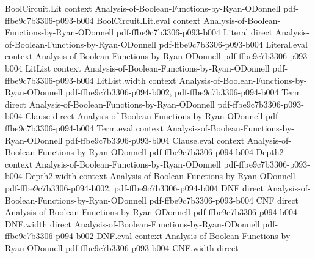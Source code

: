 \begin{lemma}
\label{LMN.depth3_restricted_has_nice_cnf}
\leanok
{}
\proofstep
  {BoolCircuit.Lit}
  {context}
  {Analysis-of-Boolean-Functions-by-Ryan-ODonnell}
  {pdf-ffbe9c7b3306-p093-b004}
\proofstep
  {BoolCircuit.Lit.eval}
  {context}
  {Analysis-of-Boolean-Functions-by-Ryan-ODonnell}
  {pdf-ffbe9c7b3306-p093-b004}
\proofstep
  {Literal}
  {direct}
  {Analysis-of-Boolean-Functions-by-Ryan-ODonnell}
  {pdf-ffbe9c7b3306-p093-b004}
\proofstep
  {Literal.eval}
  {context}
  {Analysis-of-Boolean-Functions-by-Ryan-ODonnell}
  {pdf-ffbe9c7b3306-p093-b004}
\proofstep
  {LitList}
  {context}
  {Analysis-of-Boolean-Functions-by-Ryan-ODonnell}
  {pdf-ffbe9c7b3306-p093-b004}
\proofstep
  {LitList.width}
  {context}
  {Analysis-of-Boolean-Functions-by-Ryan-ODonnell}
  {pdf-ffbe9c7b3306-p094-b002,
    pdf-ffbe9c7b3306-p094-b004}
\proofstep
  {Term}
  {direct}
  {Analysis-of-Boolean-Functions-by-Ryan-ODonnell}
  {pdf-ffbe9c7b3306-p093-b004}
\proofstep
  {Clause}
  {direct}
  {Analysis-of-Boolean-Functions-by-Ryan-ODonnell}
  {pdf-ffbe9c7b3306-p094-b004}
\proofstep
  {Term.eval}
  {context}
  {Analysis-of-Boolean-Functions-by-Ryan-ODonnell}
  {pdf-ffbe9c7b3306-p093-b004}
\proofstep
  {Clause.eval}
  {context}
  {Analysis-of-Boolean-Functions-by-Ryan-ODonnell}
  {pdf-ffbe9c7b3306-p094-b004}
\proofstep
  {Depth2}
  {context}
  {Analysis-of-Boolean-Functions-by-Ryan-ODonnell}
  {pdf-ffbe9c7b3306-p093-b004}
\proofstep
  {Depth2.width}
  {context}
  {Analysis-of-Boolean-Functions-by-Ryan-ODonnell}
  {pdf-ffbe9c7b3306-p094-b002,
    pdf-ffbe9c7b3306-p094-b004}
\proofstep
  {DNF}
  {direct}
  {Analysis-of-Boolean-Functions-by-Ryan-ODonnell}
  {pdf-ffbe9c7b3306-p093-b004}
\proofstep
  {CNF}
  {direct}
  {Analysis-of-Boolean-Functions-by-Ryan-ODonnell}
  {pdf-ffbe9c7b3306-p094-b004}
\proofstep
  {DNF.width}
  {direct}
  {Analysis-of-Boolean-Functions-by-Ryan-ODonnell}
  {pdf-ffbe9c7b3306-p094-b002}
\proofstep
  {DNF.eval}
  {context}
  {Analysis-of-Boolean-Functions-by-Ryan-ODonnell}
  {pdf-ffbe9c7b3306-p093-b004}
\proofstep
  {CNF.width}
  {direct}

\end{lemma}
